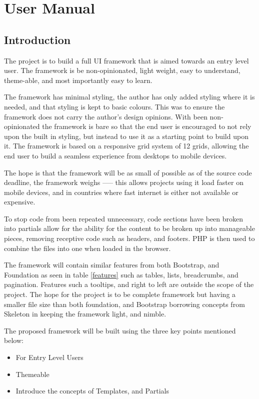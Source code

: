 \newpage
\chapter*{User Manual}
\section*{Introduction}

The project is to build a full \gls{UI} framework that is aimed towards an entry level user. The framework is be non-opinionated, light weight, easy to understand, theme-able, and most importantly easy to learn.

The framework has minimal styling, the author has only added styling where it is needed, and that styling is kept to basic colours. This was to ensure the framework does not carry the author's design opinions. With been non-opinionated the framework is bare so that the end user is encouraged to not rely upon the built in styling, but instead to use it as a starting point to build upon it. The framework is based on a responsive grid system of 12 grids, allowing the end user to build a seamless experience from desktops to mobile devices.

The hope is that the framework will be as small of possible as of the source code deadline, the framework weighs ----- this allows projects using it load faster on mobile devices, and in countries where fast internet is either not available or expensive. 

To stop code from been repeated unnecessary, code sections have been broken into partials allow for the ability for the content to be broken up into manageable pieces, removing receptive code such as headers, and footers. PHP is then used to combine the files into one when loaded in the browser. 

\newpage
The framework will contain similar features from both Bootstrap, and Foundation as seen in table \ref{features} such as tables, lists, breadcrumbs, and pagination. Features such a tooltips, and right to left are outside the scope of the project. The hope for the project is to be complete framework but having a smaller file size than both foundation, and Bootstrap borrowing concepts from Skeleton in keeping the framework light, and nimble. 

The proposed framework will be built using the three key points mentioned below: 
\begin{itemize}
	\item For Entry Level Users
	\item Themeable
	\item Introduce the concepts of Templates, and Partials
\end{itemize}
